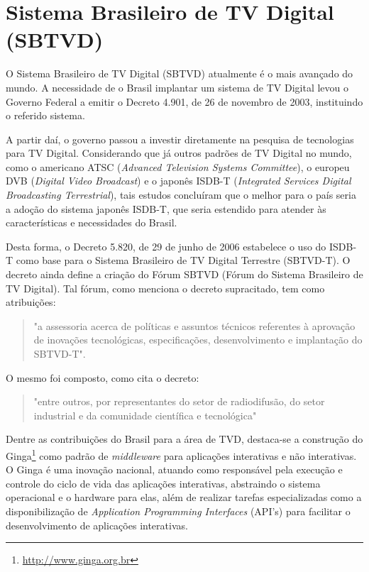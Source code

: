 \section{Sistema Brasileiro de TV Digital (SBTVD)}

O Sistema Brasileiro de TV Digital (SBTVD) atualmente é o mais
avançado do mundo. A necessidade de o Brasil implantar um sistema de TV Digital
levou o Governo Federal a emitir o Decreto 4.901, de 26 de novembro de 2003, instituindo
o referido sistema.

A partir daí, o governo passou a investir diretamente na pesquisa de tecnologias
para TV Digital. Considerando que já  outros padrões de TV Digital
no mundo, como o americano ATSC (\textit{Advanced Television Systems Committee}), 
o europeu DVB (\textit{Digital Video Broadcast}) 
e o japonês ISDB-T (\textit{Integrated Services Digital Broadcasting Terrestrial}), tais estudos concluíram que o melhor para o país seria a adoção do sistema japonês ISDB-T,
que seria estendido para atender às características e necessidades do Brasil.

Desta forma, o Decreto 5.820, de 29 de junho de 2006 estabelece o uso do ISDB-T
como base para o Sistema Brasileiro de TV Digital Terrestre (SBTVD-T).
O decreto ainda define a criação do Fórum SBTVD (Fórum do Sistema Brasileiro de TV Digital).
Tal fórum, como menciona o decreto supracitado, tem como atribuições: 

\begin{quote}
"a assessoria acerca de políticas e assuntos técnicos referentes à aprovação de inovações
tecnológicas, especificações, desenvolvimento e implantação do SBTVD-T".
\end{quote}
 
O mesmo foi composto, como cita o decreto: 
\begin{quote}
"entre outros, por representantes do setor de
radiodifusão, do setor industrial e da comunidade científica e tecnológica"
\end{quote}

Dentre as contribuições do Brasil para a área de TVD, destaca-se a construção do Ginga\footnote{\url{http://www.ginga.org.br}}
como padrão de \textit{middleware} para aplicações interativas e não interativas.
O Ginga é uma inovação nacional, atuando como responsável
pela execução e controle do ciclo de vida das aplicações interativas, abstraindo o sistema operacional
e o hardware para elas, além de realizar tarefas especializadas como a disponibilização de \textit{Application Programming Interfaces} (API's) para
facilitar o desenvolvimento de aplicações interativas\cite{soares2009programando}.

